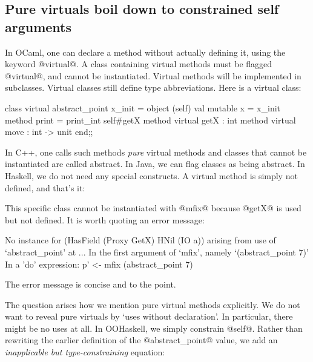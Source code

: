 


\subsection{Pure virtuals boil down to constrained self arguments}

In OCaml, one can declare a method without actually defining it, using
the keyword @virtual@. A class containing virtual methods must be
flagged @virtual@, and cannot be instantiated. Virtual methods will be
implemented in subclasses. Virtual classes still define type
abbreviations. Here is a virtual class:

\begin{code}
 class virtual abstract_point x_init =
   object (self)
     val mutable x = x_init
     method print = print_int self#getX
     method virtual getX : int
     method virtual move : int -> unit
   end;;
\end{code}

\noindent
In C++, one calls such methods \emph{pure} virtual methods and classes
that cannot be instantiated are called abstract. In Java, we can flag
classes as being abstract. In Haskell, we do not need any special
constructs. A virtual method is simply not defined, and that's it:


\noindent
This specific class cannot be instantiated with @mfix@ because @getX@
is used but not defined. It is worth quoting an error message:
\begin{code}
    No instance for (HasField (Proxy GetX) HNil (IO a))
      arising from use of `abstract_point' at ...
    In the first argument of `mfix', namely `(abstract_point 7)'
    In a 'do' expression: p' <- mfix (abstract_point 7)
\end{code}
The error message is concise and to the point.

The question arises how we mention pure virtual methods explicitly. We
do not want to reveal pure virtuals by `uses without declaration'. In
particular, there might be no uses at all. In OOHaskell, we simply
constrain @self@. Rather than rewriting the earlier definition of the
@abstract_point@ value, we add an \emph{inapplicable but
  type-constraining} equation:

